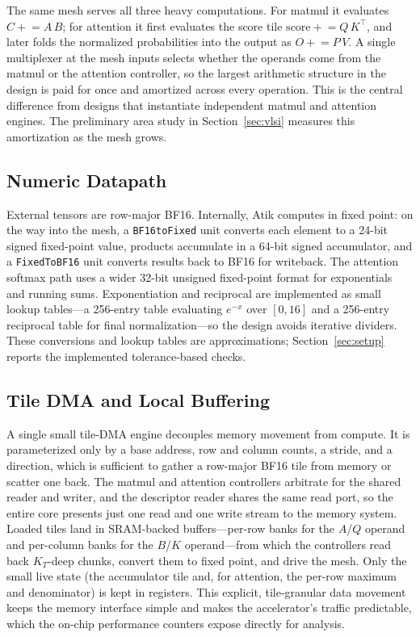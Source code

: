 \documentclass[sigconf,nonacm]{acmart}
\begin{document}
The same mesh serves all three heavy computations. For matmul it evaluates
$C \mathrel{+}= A\,B$; for attention it first evaluates the score tile
$\mathrm{score} \mathrel{+}= Q\,K^\top$, and later folds the normalized
probabilities into the output as $O \mathrel{+}= P\,V$. A single multiplexer at
the mesh inputs selects whether the operands come from the matmul or the
attention controller, so the largest arithmetic structure in the design is paid
for once and amortized across every operation. This is the central difference
from designs that instantiate independent matmul and attention engines. The
preliminary area study in Section~\ref{sec:vlsi} measures this amortization as
the mesh grows.

\subsection{Numeric Datapath}
External tensors are row-major BF16. Internally, Atik computes in fixed point: on the way into
the mesh, a \texttt{BF16toFixed} unit converts each element to a 24-bit signed
fixed-point value, products accumulate in a 64-bit signed accumulator, and a
\texttt{FixedToBF16} unit converts results back to BF16 for writeback. The
attention softmax path uses a wider 32-bit unsigned fixed-point format for
exponentials and running sums. Exponentiation and reciprocal are implemented as
small lookup tables---a 256-entry table evaluating $e^{-x}$ over $[0,16]$ and
a 256-entry reciprocal table for final normalization---so the design avoids
iterative dividers. These conversions and lookup tables are approximations;
Section~\ref{sec:setup} reports the implemented tolerance-based checks.

\subsection{Tile DMA and Local Buffering}
A single small tile-DMA engine decouples memory movement from compute. It is
parameterized only by a base address, row and column counts, a stride, and a
direction, which is sufficient to gather a row-major BF16 tile from memory or
scatter one back. The matmul and attention controllers arbitrate for the shared
reader and writer, and the descriptor reader shares the same read port, so the
entire core presents just one read and one write stream to the memory system.
Loaded tiles land in SRAM-backed buffers---per-row banks for the $A$/$Q$ operand
and per-column banks for the $B$/$K$ operand---from which the controllers read
back $K_T$-deep chunks, convert them to fixed point, and drive the mesh. Only
the small live state (the accumulator tile and, for attention, the per-row
maximum and denominator) is kept in registers. This explicit, tile-granular
data movement keeps the memory interface simple and makes the accelerator's
traffic predictable, which the on-chip performance counters expose directly for
analysis.
\end{document}
